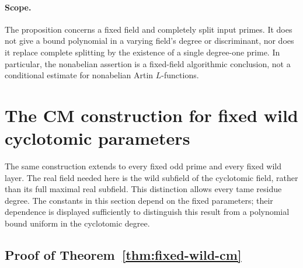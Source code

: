 \documentclass[11pt]{article}
\theoremstyle{definition}
\theoremstyle{remark}
\begin{document}
\paragraph{Scope.}
The proposition concerns a fixed field and completely split input primes.
It does not give a bound polynomial in a varying field's degree or
discriminant, nor does it replace complete splitting by the existence of a
single degree-one prime.  In particular, the nonabelian assertion is a
fixed-field algorithmic conclusion, not a conditional estimate for
nonabelian Artin $L$-functions.


\section{The CM construction for fixed wild cyclotomic parameters}
\label{sec:fixed-wild-cm}

The same construction extends to every fixed odd prime and every
fixed wild layer. The real field needed here is the wild subfield
of the cyclotomic field, rather than its full maximal real
subfield. This distinction allows every tame residue degree.
The constants in this section depend on the fixed parameters;
their dependence is displayed sufficiently to distinguish this
result from a polynomial bound uniform in the cyclotomic degree.

\subsection*{Proof of Theorem~\ref{thm:fixed-wild-cm}}
\end{document}

